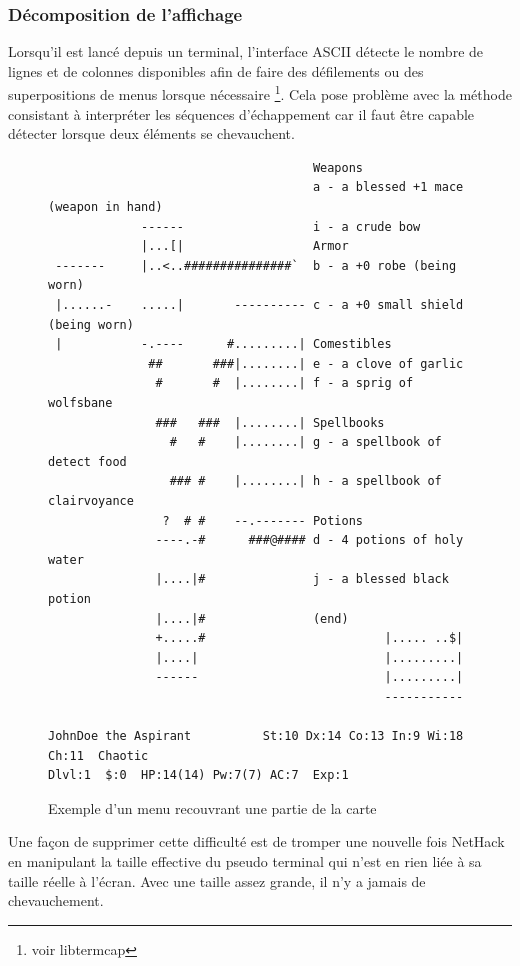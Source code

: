 \documentclass[a4paper,12pt]{article}
\begin{document}
\subsubsection*{Décomposition de l'affichage}

Lorsqu'il est lancé depuis un terminal, l'interface ASCII détecte le nombre de
lignes et de colonnes disponibles afin de faire des défilements ou des
superpositions de menus lorsque nécessaire \footnote{voir libtermcap}. Cela
pose problème avec la méthode consistant à interpréter les séquences
d'échappement car il faut être capable détecter lorsque deux éléments se
chevauchent.

\begin{figure}[h]
	\caption{Exemple d'un menu recouvrant une partie de la carte}
	\begin{verbatim}
                                     Weapons
                                     a - a blessed +1 mace (weapon in hand)
             ------                  i - a crude bow
             |...[|                  Armor
 -------     |..<..###############`  b - a +0 robe (being worn)
 |......-    .....|       ---------- c - a +0 small shield (being worn)
 |           -.----      #.........| Comestibles
              ##       ###|........| e - a clove of garlic
               #       #  |........| f - a sprig of wolfsbane
               ###   ###  |........| Spellbooks
                 #   #    |........| g - a spellbook of detect food
                 ### #    |........| h - a spellbook of clairvoyance
                ?  # #    --.------- Potions
               ----.-#      ###@#### d - 4 potions of holy water
               |....|#               j - a blessed black potion
               |....|#               (end) 
               +.....#                         |..... ..$|
               |....|                          |.........|
               ------                          |.........|
                                               -----------

JohnDoe the Aspirant          St:10 Dx:14 Co:13 In:9 Wi:18 Ch:11  Chaotic
Dlvl:1  $:0  HP:14(14) Pw:7(7) AC:7  Exp:1
	\end{verbatim}
\end{figure}

Une façon de supprimer cette difficulté est de tromper une nouvelle fois
NetHack en manipulant la taille effective du pseudo terminal qui n'est en rien
liée à sa taille réelle à l'écran. Avec une taille assez grande, il n'y a
jamais de chevauchement.
\end{document}
